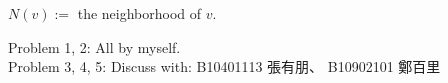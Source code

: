\begin{nota}
$N(v):=$ the neighborhood of $v$.
\end{nota}

\setcounter{pr}{-1}

\begin{pr}$ $\\
Problem 1, 2: All by myself.\\
Problem 3, 4, 5: Discuss with: B10401113 張有朋、 B10902101 鄭百里
\end{pr}
